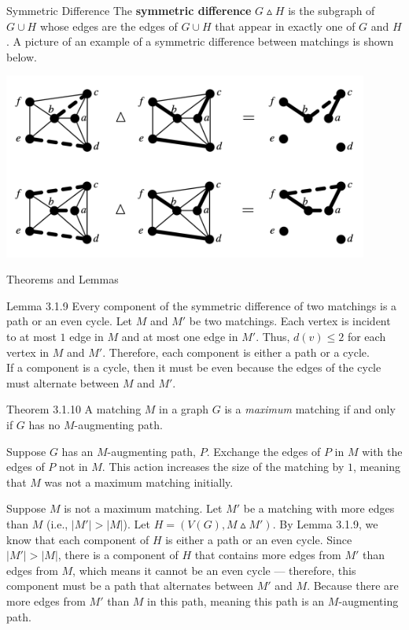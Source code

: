 \documentclass[10pt]{extarticle}
\begin{document}
  \begin{problem}{Symmetric Difference}
    The \textbf{symmetric difference} $G\vartriangle H$ is the subgraph of $G\cup H$ whose edges are the edges of $G\cup H$ that appear in exactly one of $G$ and $H$. A picture of an example of a symmetric difference between matchings is shown below.
    \begin{center}
      \includegraphics[width=12cm]{symmetric_difference}
    \end{center}
  \end{problem}
  \begin{problem}{Theorems and Lemmas}
    \begin{problem}{Lemma 3.1.9}
      Every component of the symmetric difference of two matchings is a path or an even cycle.
      \tcblower
      Let $M$ and $M'$ be two matchings. Each vertex is incident to at most $1$ edge in $M$ and at most one edge in $M'$. Thus, $d(v)\leq 2$ for each vertex in $M$ and $M'$. Therefore, each component is either a path or a cycle.\\

      If a component is a cycle, then it must be even because the edges of the cycle must alternate between $M$ and $M'$.
    \end{problem}
    \begin{problem}{Theorem 3.1.10}
      A matching $M$ in a graph $G$ is a \textit{maximum} matching if and only if $G$ has no $M$-augmenting path.
      \tcblower
      \begin{description}[font=\normalfont\scshape]
        \item[($\Rightarrow$)] Suppose $G$ has an $M$-augmenting path, $P$. Exchange the edges of $P$ in $M$ with the edges of $P$ not in $M$. This action increases the size of the matching by $1$, meaning that $M$ was not a maximum matching initially.
        \item[$\Leftarrow$] Suppose $M$ is not a maximum matching. Let $M'$ be a matching with more edges than $M$ (i.e., $|M'| > |M|$). Let $H = (V(G),M\vartriangle M')$. By Lemma 3.1.9, we know that each component of $H$ is either a path or an even cycle. Since $|M'| > |M|$, there is a component of $H$ that contains more edges from $M'$ than edges from $M$, which means it cannot be an even cycle --- therefore, this component must be a path that alternates between $M'$ and $M$. Because there are more edges from $M'$ than $M$ in this path, meaning this path is an $M$-augmenting path.
      \end{description}
    \end{problem}
  \end{problem}
\end{document}
